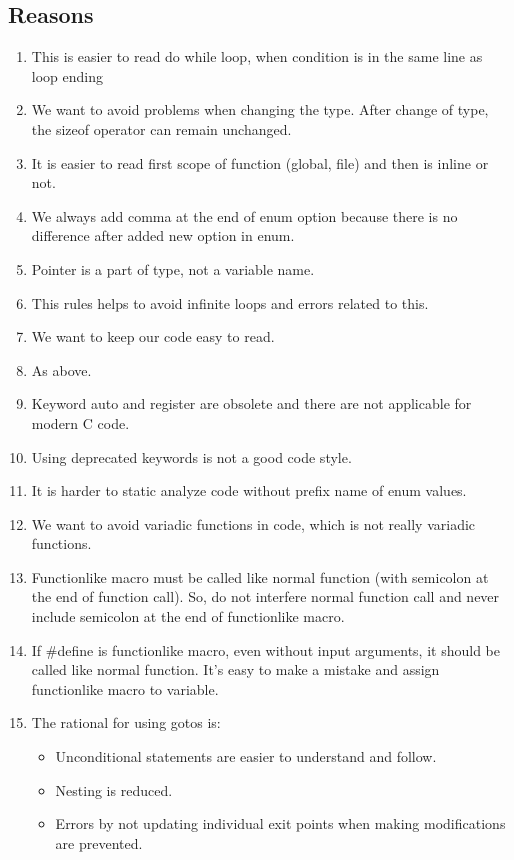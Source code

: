 \subsection{Reasons}
\begin{enumerate}
    \item This is easier to read do while loop, when condition is in the same line as loop ending
    \item We want to avoid problems when changing the type. After change of type, the sizeof operator can remain unchanged.
    \item It is easier to read first scope of function (global, file) and then is inline or not.
    \item We always add comma at the end of enum option because there is no difference after added new option in enum.
    \item Pointer is a part of type, not a variable name.
    \item This rules helps to avoid infinite loops and errors related to this.
    \item We want to keep our code easy to read.
    \item As above.
    \item Keyword auto and register are obsolete and there are not applicable for modern C code.
    \item Using deprecated keywords is not a good code style.
    \item It is harder to static analyze code without prefix name of enum values. 
    \item We want to avoid variadic functions in code, which is not really variadic functions.
    \item Functionlike macro must be called like normal function (with semicolon at the end of function call). So, do not interfere normal function call and never include semicolon at the end of functionlike macro.
    \item If \#define is functionlike macro, even without input arguments, it should be called like normal function. 
    It's easy to make a mistake and assign functionlike macro to variable.
    \item The rational for using gotos is:
        \begin{itemize}
            \item Unconditional statements are easier to understand and follow.
            \item Nesting is reduced.
            \item Errors by not updating individual exit points when making modifications are prevented.

\end{itemize}
\end{enumerate}

